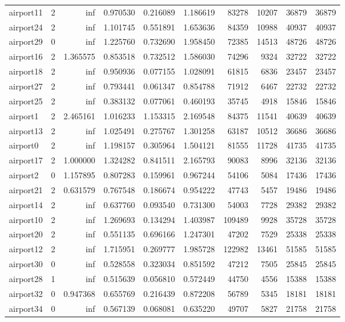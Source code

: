 \begin{longtable}{|l|r|r|r|r|r|r|r|r|r|}
airport11 & 2 & inf & 0.970530 & 0.216089 & 1.186619 & 83278 & 10207 & 36879 & 36879 \\
airport24 & 2 & inf & 1.101745 & 0.551891 & 1.653636 & 84359 & 10988 & 40937 & 40937 \\
airport29 & 0 & inf & 1.225760 & 0.732690 & 1.958450 & 72385 & 14513 & 48726 & 48726 \\
airport16 & 2 & 1.365575 & 0.853518 & 0.732512 & 1.586030 & 74296 & 9324 & 32722 & 32722 \\
airport18 & 2 & inf & 0.950936 & 0.077155 & 1.028091 & 61815 & 6836 & 23457 & 23457 \\
airport27 & 2 & inf & 0.793441 & 0.061347 & 0.854788 & 71912 & 6467 & 22732 & 22732 \\
airport25 & 2 & inf & 0.383132 & 0.077061 & 0.460193 & 35745 & 4918 & 15846 & 15846 \\
airport1 & 2 & 2.465161 & 1.016233 & 1.153315 & 2.169548 & 84375 & 11541 & 40639 & 40639 \\
airport13 & 2 & inf & 1.025491 & 0.275767 & 1.301258 & 63187 & 10512 & 36686 & 36686 \\
airport0 & 2 & inf & 1.198157 & 0.305964 & 1.504121 & 81555 & 11728 & 41735 & 41735 \\
airport17 & 2 & 1.000000 & 1.324282 & 0.841511 & 2.165793 & 90083 & 8996 & 32136 & 32136 \\
airport2 & 0 & 1.157895 & 0.807283 & 0.159961 & 0.967244 & 54106 & 5084 & 17436 & 17436 \\
airport21 & 2 & 0.631579 & 0.767548 & 0.186674 & 0.954222 & 47743 & 5457 & 19486 & 19486 \\
airport14 & 2 & inf & 0.637760 & 0.093540 & 0.731300 & 54003 & 7728 & 29382 & 29382 \\
airport10 & 2 & inf & 1.269693 & 0.134294 & 1.403987 & 109489 & 9928 & 35728 & 35728 \\
airport20 & 2 & inf & 0.551135 & 0.696166 & 1.247301 & 47202 & 7529 & 25338 & 25338 \\
airport12 & 2 & inf & 1.715951 & 0.269777 & 1.985728 & 122982 & 13461 & 51585 & 51585 \\
airport30 & 0 & inf & 0.528558 & 0.323034 & 0.851592 & 47212 & 7505 & 25845 & 25845 \\
airport28 & 1 & inf & 0.515639 & 0.056810 & 0.572449 & 44750 & 4556 & 15388 & 15388 \\
airport32 & 0 & 0.947368 & 0.655769 & 0.216439 & 0.872208 & 56789 & 5345 & 18181 & 18181 \\
airport34 & 0 & inf & 0.567139 & 0.068081 & 0.635220 & 49707 & 5827 & 21758 & 21758 \\

\end{longtable}
